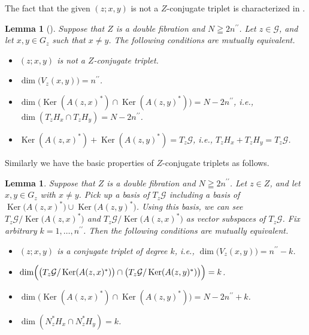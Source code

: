 \documentclass[a4paper,11pt,reqno]{amsart}
\newtheorem{lemma}[theorem]{Lemma}
\theoremstyle{definition}
\theoremstyle{remark}
\begin{document}
%
%
The fact that the given $(z;x,y)$ is not a $Z$-conjugate triplet is characterized in 
\cite{MazzucchelliSaloTzou}. 
%
%
\begin{lemma}[{\cite[Lemma~3.1]{MazzucchelliSaloTzou}}]
\label{theorem:notzconjugate}
Suppose that $Z$ is a double fibration and $N \geqq 2n^{\prime\prime}$. 
Let $z \in \mathcal{G}$, and let $x,y \in G_z$ such that $x{\ne}y$. 
The following conditions are mutually equivalent.
%
%
\begin{itemize}
\item[{\rm (a)}] 
$(z;x,y)$ is not a $Z$-conjugate triplet. 
\item[{\rm (b)}] 
$\dim\bigl(V_z(x,y)\bigr)=n^{\prime\prime}$. 
\item[{\rm (c)}] 
$\dim
\bigl(
\operatorname{Ker}(A(z,x)^\ast)
\cap
\operatorname{Ker}(A(z,y)^\ast)
\bigr)=N-2n^{\prime\prime}$, i.e., $\dim(T_zH_x{\cap}T_zH_y)=N-2n^{\prime\prime}$. 
\item[{\rm (d)}] 
$\operatorname{Ker}(A(z,x)^\ast)+\operatorname{Ker}(A(z,y)^\ast)=T_z\mathcal{G}$, 
i.e., $T_zH_x+T_zH_y=T_z\mathcal{G}$. 
\end{itemize}
%
%
\end{lemma}
%
%
Similarly we have the basic properties of $Z$-conjugate triplets as follows. 
%
%
\begin{lemma}
\label{theorem:zconjugateproperty}
Suppose that $Z$ is a double fibration and $N \geqq 2n^{\prime\prime}$. 
Let $z \in Z$, and let $x,y \in G_z$ with $x{\ne}y$. 
Pick up a basis of $T_z\mathcal{G}$ including a basis of 
$\operatorname{Ker}\bigl(A(z,x)^\ast\bigr)\cup\operatorname{Ker}\bigl(A(z,y)^\ast\bigr)$. 
Using this basis, we can see 
$T_z\mathcal{G}/\operatorname{Ker}\bigl(A(z,x)^\ast\bigr)$ and 
$T_z\mathcal{G}/\operatorname{Ker}\bigl(A(z,x)^\ast\bigr)$ as vector subspaces of $T_z\mathcal{G}$. 
Fix arbitrary $k=1,\dotsc,n^{\prime\prime}$. 
Then the following conditions are mutually equivalent. 
%
%
\begin{itemize}
\item[{\rm (a)}] 
$(z;x,y)$ is a conjugate triplet of degree $k$, i.e., 
$\dim\bigl(V_z(x,y)\bigr)=n^{\prime\prime}-k$.  
\item[{\rm (b)}] 
$\dim
\Bigl(
\bigl(
T_z\mathcal{G}/\operatorname{Ker}(A(z,x)^\ast)
\bigr)
\cap
\bigl(
T_z\mathcal{G}/\operatorname{Ker}(A(z,y)^\ast)
\bigr)
\Bigr)=k$.
\item[{\rm (c)}] 
$\dim
\bigl(
\operatorname{Ker}(A(z,x)^\ast)
\cap
\operatorname{Ker}(A(z,y)^\ast)
\bigr)=N-2n^{\prime\prime}+k$.
\item[{\rm (d)}] 
$\dim(N^\ast_zH_x{\cap}N^\ast_zH_y)=k$. 
\end{itemize}
%
% 
\end{lemma}
\end{document}

